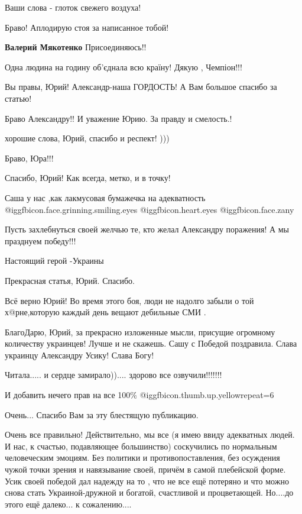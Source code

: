 \begin{itemize}
Ваши слова - глоток свежего воздуха!

Браво! Аплодирую стоя за написанное тобой!

\begin{itemize} %
\textbf{Валерий Мякотенко} Присоединяюсь!!
\end{itemize} %

Одна людина на годину об'єднала всю країну! Дякую , Чемпіон!!!

Вы правы, Юрий! Александр-наша ГОРДОСТЬ! А Вам большое спасибо за статью!

Браво Александру!! И уважение Юрию. За правду и смелость.!

хорошие слова, Юрий, спасибо и респект! )))

Браво, Юра!!!


Спасибо, Юрий! Как всегда, метко, и в точку!

Саша у нас ,как лакмусовая бумажечка на адекватность
@igg{fbicon.face.grinning.smiling.eyes}  @igg{fbicon.heart.eyes}
@igg{fbicon.face.zany} 

Пусть захлебнуться своей желчью те, кто желал Александру поражения! А мы празднуем победу!!!

Настоящий герой -Украины

Прекрасная статья, Юрий. Спасибо.

Всё верно Юрий!
Во время этого боя, люди не надолго забыли о той х@рне,которую каждый день вещают дебильные СМИ .

БлагоДарю, Юрий, за прекрасно изложенные мысли, присущие огромному количеству украинцев!
Лучше и не скажешь.
Сашу с Победой поздравила.
Слава украинцу Александру Усику!
Слава Богу!

Читала..... и сердце замирало)).... здорово все озвучили!!!!!!!

И добавить нечего прав на все 100\% @igg{fbicon.thumb.up.yellow}{repeat=6} 

Очень... Спасибо Вам за эту блестящую публикацию.


Очень все правильно! Действительно, мы все (я имею ввиду адекватных людей. И
нас, к счастью, подавляющее большинство) соскучились по нормальным человеческим
эмоциям. Без политики и противопоставления, без осуждения чужой точки зрения и
навязывание своей, причём в самой плебейской форме. Усик своей победой дал
надежду на то , что не все ещё потеряно и что можно снова стать
Украиной-дружной и богатой, счастливой и процветающей. Но....до этого ещё
далеко... к сожалению....


\end{itemize}
